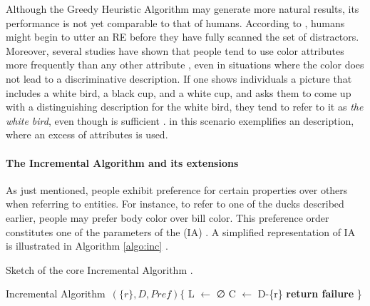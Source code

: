 Although the Greedy Heuristic Algorithm may generate more natural results, its performance is not yet comparable to that of humans. According to \citet{dale1995computational}, humans might begin to utter an RE before they have fully scanned the set of distractors.
Moreover, several studies have shown that people tend to use color attributes more frequently than any other attribute \citep{pechmann1989incremental, viethen2017color}, even in situations where the color does not lead to a discriminative description. If one shows individuals a picture that includes a white bird, a black cup, and a white cup, and asks them to come up with a distinguishing description for the white bird, they tend to refer to it as \textit{the white bird}, even though  is sufficient \citep{pechmann1989incremental}.  in this scenario exemplifies an  description, where an excess of attributes is used.

\paragraph*{The Incremental Algorithm and its extensions}
As just mentioned, people exhibit preference for certain properties over others when referring to entities. For instance, to refer to one of the ducks described earlier, people may prefer body color over bill color. This preference order constitutes one of the parameters of the  (IA) \citep{dale1995computational}. A simplified representation of IA is illustrated in Algorithm \ref{algo:inc} \citep{comreg2019}.

\begin{algorithm}
	\caption{Sketch of the core Incremental Algorithm \citep{comreg2019}.}
	\label{algo:inc}
	Incremental Algorithm~$(\{r\}, D, Pref)\{$\;
	L $\leftarrow$ ∅ \;
	C $\leftarrow$ D-\{r\}\;
	\;
	\textbf{return failure} \}\;
  
  
\end{algorithm}


